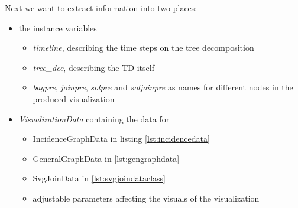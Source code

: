 \documentclass[a4paper, 12pt, bibliography=totoc]{scrartcl}
\begin{document}
Next we want to extract information into two places: 
\begin{itemize}
	\item the instance variables 
	\begin{itemize}
		\item \textit{timeline}, describing the time steps on the tree decomposition
		\item \textit{tree\_dec}, describing the TD itself
		\item \textit{bagpre}, \textit{joinpre}, \textit{solpre} and \textit{soljoinpre} as names for different nodes in the produced visualization
	\end{itemize}
	\item \textit{VisualizationData} containing the data for 
	\begin{itemize}
		\item IncidenceGraphData in listing \ref{lst:incidencedata}
		\item GeneralGraphData in \ref{lst:gengraphdata}
		\item SvgJoinData in \ref{lst:svgjoindataclass}
		\item adjustable parameters affecting the visuals of the visualization
	\end{itemize}
\end{itemize}
\end{document}
